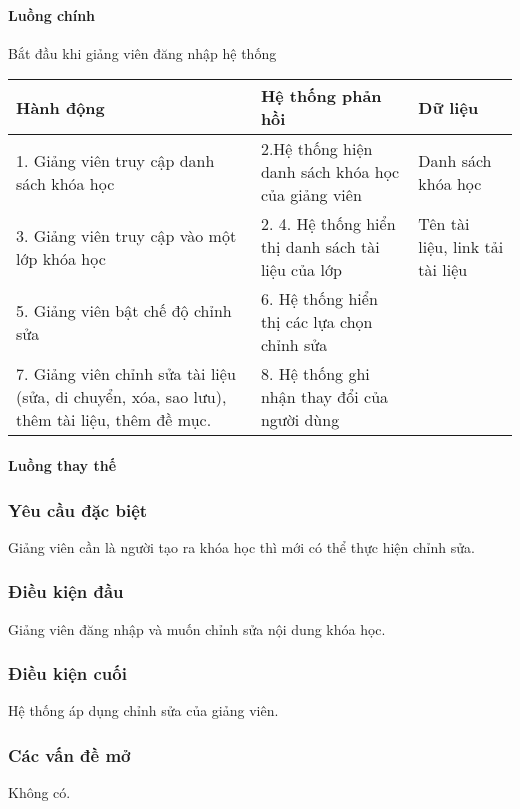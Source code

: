 \documentclass[./../main_file.tex]{subfiles}
\begin{document}
\paragraph{Luồng chính}
Bắt đầu khi giảng viên đăng nhập hệ thống
\begin{table}[H]
				\begin{tabular}{|p{.33\textwidth}|p{}|p{}|}
		\hline
		\textbf{Hành động}              & \textbf{Hệ thống phản hồi}               & \textbf{Dữ liệu} \\ \hline
		1. Giảng viên truy cập danh sách khóa học & 2.Hệ thống hiện danh sách khóa học của giảng viên & Danh sách khóa học \\ \hline
		3. Giảng viên truy cập vào một lớp khóa học                                    & 2. 4. Hệ thống hiển thị danh sách tài liệu của lớp & Tên tài liệu, link tải tài liệu \\ \hline
		5. Giảng viên bật chế độ chỉnh sửa & 6. Hệ thống hiển thị các lựa chọn chỉnh sửa &                  \\ \hline
		7. Giảng viên chỉnh sửa tài liệu (sửa, di chuyển, xóa, sao lưu), thêm tài liệu, thêm đề mục. & 8. Hệ thống ghi nhận thay đổi của người dùng    &                                 \\ \hline
	\end{tabular}
\end{table}
\paragraph{Luồng thay thế}
\subsubsection{Yêu cầu đặc biệt}
Giảng viên cần là người tạo ra khóa học thì mới có thể thực hiện chỉnh sửa.

\subsubsection{Điều kiện đầu}
Giảng viên đăng nhập và muốn chỉnh sửa nội dung khóa học.

\subsubsection{Điều kiện cuối}
Hệ thống áp dụng chỉnh sửa của giảng viên.

\subsubsection{Các vấn đề mở}
Không có.
\end{document}
